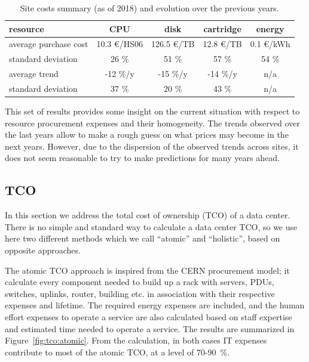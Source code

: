 \begin{table}[h]
    \centering
    \caption{Site costs summary (as of 2018) and evolution over the previous years.}
    \label{tab:sitecosts}
    \begin{tabular}{l|cccc}
        \hline
        resource & CPU & disk & cartridge & energy \\\hline
        average purchase cost & 10.3 \euro/HS06 & 126.5 \euro/TB & 12.8 \euro/TB & 0.1 \euro/kWh\\\hline
        standard deviation & 26 \% & 51 \% & 57 \% & 54 \% \\\hline
        average trend & -12 \%/y & -15 \%/y & -14 \%/y & n/a \\\hline
        standard deviation & 37 \% & 20 \% & 43 \% & n/a \\\hline
    \end{tabular}
\end{table}


This set of results provides some insight on the current situation
with respect to resource procurement expenses and their
homogeneity. The trends observed over the last years allow to make a
rough guess on what prices may become in the next years. However, due
to the dispersion of the observed trends across sites, it does not seem
reasonable to try to make predictions for many years ahead.

\subsection{\label{sec:sitecost:tco}TCO}

In this section we address the total cost of ownership (TCO) of a data center.
There is no simple and standard way to calculate a data center TCO, so we use here two different methods which we call
``atomic'' and ``holistic'', based on opposite approaches.

The atomic TCO approach is inspired from the CERN procurement model; it calculate every component needed to build up
a rack with servers, PDUs, switches, uplinks, router, building etc. in association with their respective expenses and lifetime.
The required energy expenses are included, and the human effort expenses to operate a service are also calculated
based on staff expertise and estimated time needed to operate a service.
The results are summarized in Figure~\ref{fig:tco:atomic}.
From the calculation, in both cases IT expenses contribute to most of the atomic TCO, at a level of 70-90~\%.


